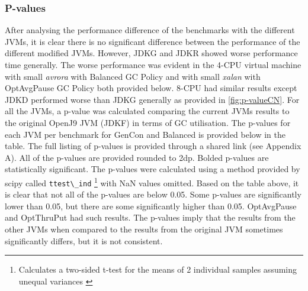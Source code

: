 \subsubsection{P-values}
After analysing the performance difference of the benchmarks with the
different JVMs, it is clear there is no significant difference between
the performance of the different modified JVMs. However, JDKG and JDKR showed
worse performance time generally. The worse performance was evident in
the 4-CPU virtual machine with small \emph{avrora} with Balanced GC Policy and
with small \emph{xalan} with OptAvgPause GC Policy both provided below. 8-CPU had similar results except JDKD performed worse than JDKG
generally as provided in \ref{fig:p-valueCN}. For all the JVMs, a p-value was
calculated comparing the current JVMs results to the original OpenJ9
JVM (JDKF) in terms of GC utilisation. The p-values for each JVM per benchmark for GenCon and Balanced is provided below in
the table. The full listing of p-values is provided through a shared link (see Appendix A). All of the p-values are provided rounded to 2dp. Bolded p-values are statistically significant. The p-values
were calculated using a method provided by scipy called
\verb|ttest\_ind| \footnote{Calculates a two-sided t-test for the means of 2 individual samples assuming unequal variances \cite{scipy-ttestind}} with NaN values omitted. 
Based on the table above, it is clear that not all of the p-values are
below 0.05. Some p-values are significantly lower than 0.05, but there
are some significantly higher than 0.05. OptAvgPause and OptThruPut had
such results. The p-values imply that the results from the other
JVMs when compared to the results from the original JVM sometimes
significantly differs, but it is not consistent. 
